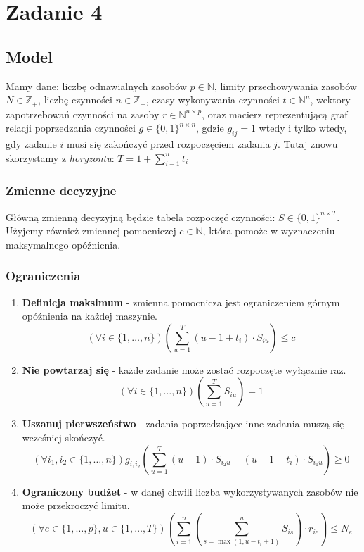 \documentclass{article}
\theoremstyle{definition}
\theoremstyle{remark}
\theoremstyle{plain}
\theoremstyle{remark}
\theoremstyle{plain}
\begin{document}
\section{Zadanie 4}
\subsection{Model}
Mamy dane: liczbę odnawialnych zasobów $p\in\mathbb{N}$, limity przechowywania zasobów $N\in\mathbb{Z}_+$, liczbę czynności $n\in\mathbb{Z}_+$, czasy wykonywania czynności $t\in\mathbb{N}^n$, wektory zapotrzebowań czynności na zasoby $r\in\mathbb{N}^{n\times p}$, oraz macierz reprezentującą graf relacji poprzedzania czynności $g\in\{0,1\}^{n\times n}$, gdzie $g_{ij}=1$ wtedy i tylko wtedy, gdy zadanie $i$ musi się zakończyć przed rozpoczęciem zadania $j$. Tutaj znowu skorzystamy z \textit{horyzontu}: $T=1+\sum_{i-1}^n{t_i}$

\subsubsection{Zmienne decyzyjne}
Główną zmienną decyzyjną będzie tabela rozpoczęć czynności: $S\in \{0,1\}^{n\times T}$. Użyjemy również zmiennej pomocniczej $c\in\mathbb{N}$, która pomoże w wyznaczeniu maksymalnego opóźnienia.

\subsubsection{Ograniczenia}
\begin{enumerate}
    \item \textbf{Definicja maksimum} - zmienna pomocnicza jest ograniczeniem górnym opóźnienia na każdej maszynie.
    \[ (\forall i \in \{1,\dots,n\}) \left(\sum_{u=1}^T{(u-1+t_i)\cdot S_{iu}} \right) \leq c \]
    \item \textbf{Nie powtarzaj się} - każde zadanie może zostać rozpoczęte wyłącznie raz.
    \[ (\forall i \in \{1,\dots,n\}) \left(\sum_{u=1}^{T}{S_{iu}} \right) = 1 \]
    \item \textbf{Uszanuj pierwszeństwo} - zadania poprzedzające inne zadania muszą się wcześniej skończyć.
    \[ (\forall i_1,i_2 \in \{1,\dots,n\}) g_{i_1i_2}\left(\sum_{u=1}^T{(u-1)\cdot S_{i_2u} - (u-1 + t_i)\cdot S_{i_1u}} \right) \geq 0 \]
    \item \textbf{Ograniczony budżet} - w danej chwili liczba wykorzystywanych zasobów nie może przekroczyć limitu.
    \[ (\forall e \in \{1,\dots,p\}, u\in\{1,\dots,T\}) \left(\sum_{i=1}^{n}{\left(\sum_{s=\max(1,u-t_i+1)}^{u}{S_{is}}\right)\cdot r_{ie}} \right) \leq N_e \]
\end{enumerate}
\end{document}

